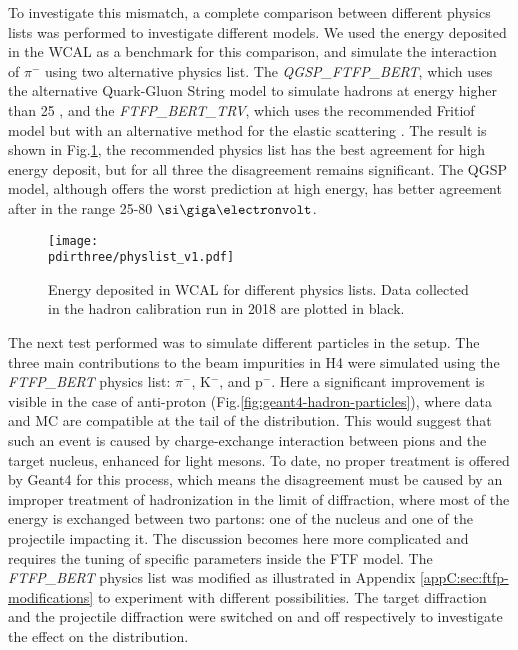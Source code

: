 To investigate this mismatch, a complete comparison between different physics lists was performed to investigate 
different models. We used the energy deposited in the WCAL as a benchmark for this comparison, and simulate the interaction of $\pi^-$ using two alternative physics list. The \textit{QGSP\_FTFP\_BERT}, which uses the alternative Quark-Gluon String model to simulate hadrons at energy higher than 25 \gev, and the \textit{FTFP\_BERT\_TRV}, which uses the recommended Fritiof model but with an alternative method for the elastic scattering \cite{AGOSTINELLI2003250}. The result is shown in Fig.\ref{fig:geant4-hadron-plist}, the recommended physics list has the best agreement for high energy deposit, but for all three the disagreement remains significant. The QGSP model, although offers the worst prediction at high energy, has better agreement after in the range 25-80 $\gev$.

\begin{figure}[tbh!]
  \centering
  \texttt{[image: \\pdirthree/physlist\_v1.pdf]}
  \caption[Comparison of physics list for $\pi^-$ in WCAL energy spectrum]{Energy deposited in WCAL for different physics lists. Data collected in the hadron calibration run in 2018 are plotted in black.}
  \label{fig:geant4-hadron-plist}
\end{figure}

The next test performed was to simulate different particles in the setup. The three main contributions to the beam impurities in H4 were simulated using the \textit{FTFP\_BERT} physics list: $\pi^-$, K$^-$, and p$^-$. Here a significant improvement is visible in the case of anti-proton (Fig.\ref{fig:geant4-hadron-particles}), where data and MC are compatible at the tail of the distribution. This would suggest that such an event is caused by charge-exchange interaction between pions and the target nucleus, enhanced for light mesons. To date, no proper treatment is offered by Geant4 for this process, which means the disagreement must be caused by an improper treatment of hadronization in the limit of diffraction,  where most of the energy is exchanged between two partons: one of the nucleus and one of the projectile impacting it. The discussion becomes here more complicated and requires the tuning of specific parameters inside the FTF model.  The \textit{FTFP\_BERT} physics list was modified as illustrated in Appendix \ref{appC:sec:ftfp-modifications} to experiment with different possibilities. The target diffraction and the projectile diffraction were switched on and off respectively to investigate the effect on the distribution.


